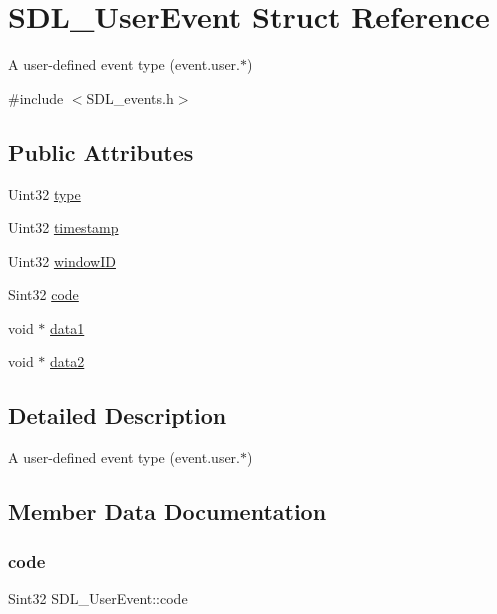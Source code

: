 \hypertarget{structSDL__UserEvent}{}\section{S\+D\+L\+\_\+\+User\+Event Struct Reference}
\label{structSDL__UserEvent}


A user-\/defined event type (event.\+user.$\ast$)  




{\ttfamily \#include $<$S\+D\+L\+\_\+events.\+h$>$}

\subsection*{Public Attributes}
\begin{DoxyCompactItemize}
\item 
Uint32 \hyperlink{structSDL__UserEvent_ab7afa8b98dbd7b52bef41155e10f7340}{type}
\item 
Uint32 \hyperlink{structSDL__UserEvent_adbf1d34c73138a0c549310e5d4ad0c35}{timestamp}
\item 
Uint32 \hyperlink{structSDL__UserEvent_abccefa10e0e0e3a0801bc6d836a08da7}{window\+ID}
\item 
Sint32 \hyperlink{structSDL__UserEvent_aef47976781ee82b527a353c5acfa0a34}{code}
\item 
void $\ast$ \hyperlink{structSDL__UserEvent_ab2893a12be2f97195f16463a23107913}{data1}
\item 
void $\ast$ \hyperlink{structSDL__UserEvent_aae4dbf65c34d654c9edf519eb061b7cf}{data2}
\end{DoxyCompactItemize}


\subsection{Detailed Description}
A user-\/defined event type (event.\+user.$\ast$) 

\subsection{Member Data Documentation}
\mbox{\label{structSDL__UserEvent_aef47976781ee82b527a353c5acfa0a34}} 
\subsubsection{\texorpdfstring{code}{code}}
{\footnotesize\ttfamily Sint32 S\+D\+L\+\_\+\+User\+Event\+::code}

